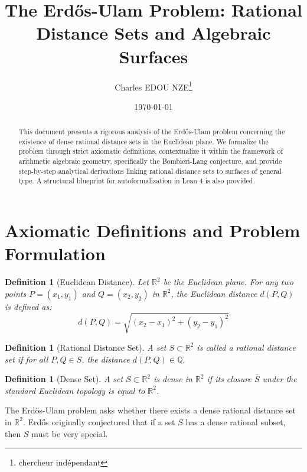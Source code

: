 \documentclass[12pt,a4paper]{article}
\title{The Erd\H{o}s-Ulam Problem: Rational Distance Sets and Algebraic Surfaces}
\author{Charles EDOU NZE\thanks{chercheur ind\'ependant}}
\date{\today}
\newtheorem{definition}[theorem]{Definition}
\begin{document}
\maketitle
\thispagestyle{fancy}
\fancyhf{}
\renewcommand{\headrulewidth}{0pt}

\begin{abstract}
This document presents a rigorous analysis of the Erd\H{o}s-Ulam problem concerning the existence of dense rational distance sets in the Euclidean plane. We formalize the problem through strict axiomatic definitions, contextualize it within the framework of arithmetic algebraic geometry, specifically the Bombieri-Lang conjecture, and provide step-by-step analytical derivations linking rational distance sets to surfaces of general type. A structural blueprint for autoformalization in Lean 4 is also provided.
\end{abstract}

\tableofcontents
\newpage

\section{Axiomatic Definitions and Problem Formulation}

\begin{definition}[Euclidean Distance]
Let $\mathbb{R}^2$ be the Euclidean plane. For any two points $P = (x_1, y_1)$ and $Q = (x_2, y_2)$ in $\mathbb{R}^2$, the Euclidean distance $d(P, Q)$ is defined as:
\begin{equation}
d(P, Q) = \sqrt{(x_2 - x_1)^2 + (y_2 - y_1)^2}
\end{equation}
\end{definition}

\begin{definition}[Rational Distance Set]
A set $S \subset \mathbb{R}^2$ is called a \textit{rational distance set} if for all $P, Q \in S$, the distance $d(P, Q) \in \mathbb{Q}$.
\end{definition}

\begin{definition}[Dense Set]
A set $S \subset \mathbb{R}^2$ is \textit{dense} in $\mathbb{R}^2$ if its closure $\overline{S}$ under the standard Euclidean topology is equal to $\mathbb{R}^2$.
\end{definition}

The Erd\H{o}s-Ulam problem asks whether there exists a dense rational distance set in $\mathbb{R}^2$. Erd\H{o}s originally conjectured that if a set $S$ has a dense rational subset, then $S$ must be very special.
\end{document}
